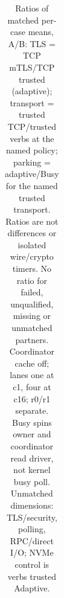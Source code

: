 \begin{table}[H]
\begin{tabular}{llllll}
\bottomrule\end{tabular}
\caption{Ratios of matched per-case means, A/B: TLS = TCP mTLS/TCP trusted (adaptive); transport = trusted TCP/trusted verbs at the named policy; parking = adaptive/Busy for the named trusted transport. Ratios are not differences or isolated wire/crypto timers. No ratio for failed, unqualified, missing or unmatched partners. Coordinator cache off; lanes one at c1, four at c16; r0/r1 separate. Busy spins owner and coordinator read driver, not kernel busy poll. Unmatched dimensions: TLS/security, polling, RPC/direct I/O; NVMe control is verbs trusted Adaptive.}
\end{table}
